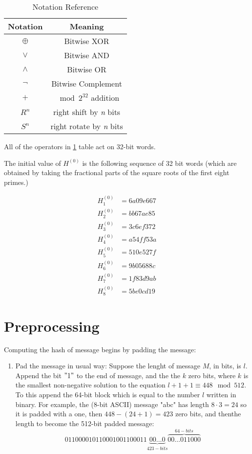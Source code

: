 \documentclass{report}
\begin{document}
\begin{center}
	\begin{table}[h!]
		\centering
		\begin{tabular}{|| c | c ||}
			\hline 
			\textbf{Notation} & \textbf{Meaning} \\ 
			\hline 
			$\oplus$ & Bitwise XOR \\
			\hline 
			$\vee$ & Bitwise AND \\ 
			\hline 
			$\wedge$ & Bitwise OR \\
			\hline 
			$\neg$ & Bitwise Complement\\ 
			\hline 
			$+$ & $\mod 2^{32}$ addition \\
			\hline 
			$R^{n}$ & right shift by \textit{n} bits\\
			\hline 
			$S^{n}$ & right rotate by \textit{n} bits\\
			\hline
		\end{tabular}
		\caption{Notation Reference}
		\label{notation-reference}
	\end{table}
\end{center}

All of the operators in \ref{notation-reference} table act on 32-bit words.

The initial value of $H^{(0)}$ is the following sequence of 32 bit words (which are obtained by taking the fractional parts of the square roots of the first eight primes.)

\begin{align}
	H_{1}^{(0)} &= 6a09e667 \\
	H_{2}^{(0)} &= bb67ae85 \\
	H_{3}^{(0)} &= 3c6ef372 \\
	H_{4}^{(0)} &= a54ff53a \\
	H_{5}^{(0)} &= 510e527f \\
	H_{6}^{(0)} &= 9b05688c \\
	H_{7}^{(0)} &= 1f83d9ab \\
	H_{8}^{(0)} &= 5be0cd19
\end{align}

\section{Preprocessing}
Computing the hash of message begins by padding the message: 
\begin{enumerate}
	\item{Pad the message in usual way:}
		Suppose the lenght of message $M$, in bits, is $l$. Append the bit $"1"$ to the end of message, and the the $k$ zero bits, where $k$ is the smallest non-negative solution to the equation $l + 1 + 1 \equiv 448 \mod 512$. To this append the 64-bit block which is equal to the number $l$ written in binary. For example, the (8-bit ASCII) message "abc" has length $8 \cdot 3 = 24$ so it is padded with a one, then $448 - (24 + 1) = 423$ zero bits, and thenthe length to become the 512-bit padded message: 
		\[ 01100001 01100010 01100011 \underbrace{00\ldots0}_{423-bits} \overbrace{00\ldots011000}^{64-bits} \]
\end{enumerate}

\appendix
\end{document}
